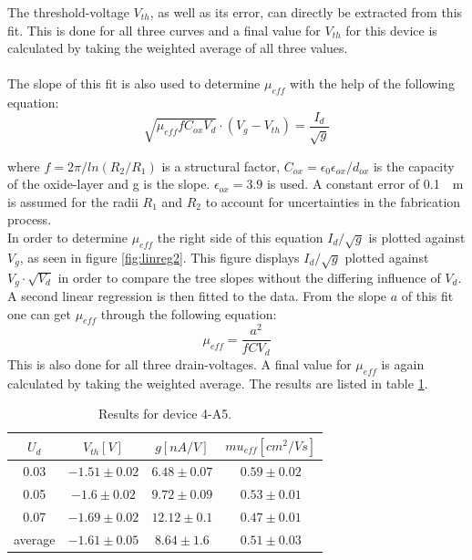 \documentclass[%
 reprint,
amsmath,amssymb,
pra,
]{revtex4-1}
\begin{document}
The threshold-voltage $V_{th}$, as well as its error, can directly be extracted from this fit. This is done for all three curves and a final value for $V_{th}$ for this device is calculated by taking the weighted average of all three values.\\
\\
The slope of this fit is also used to determine $\mu_{eff}$ with the help of the following equation:
\begin{equation}
\sqrt{\mu_{eff} f C_{ox} V_d} \cdot (V_g-V_{th}) = \dfrac{I_d}{\sqrt{g}}
\end{equation}

where $f = 2\pi / ln(R_2/R_1)$ is a structural factor, $C_{ox} = \epsilon_0 \epsilon_{ox} / d_{ox}$ is the capacity of the oxide-layer and g is the slope. $\epsilon_{ox} = 3.9$ is used. A constant error of \SI{0.1}{\mu m} is assumed for the radii $R_1$ and $R_2$ to account for uncertainties in the fabrication process.\\
In order to determine  $\mu_{eff}$ the right side of this equation $I_d/\sqrt{g}$ is plotted against $V_g$, as seen in figure \ref{fig:linreg2}. This figure displays $I_d/\sqrt{g}$ plotted against $V_g \cdot \sqrt{V_d}$ in order to compare the tree slopes without the differing influence of $V_d$. A second linear regression is then fitted to the data. From the slope $a$ of this fit one can get $\mu_{eff}$ through the following equation:
\begin{equation}
\mu_{eff} = \dfrac{a^2}{f C V_d}
\end{equation}
This is also done for all three drain-voltages. A final value for $\mu_{eff}$ is again calculated by taking the weighted average. The results are listed in table \ref{tab: exaple_data}.

\begin{table}
\centering
\begin{tabular}{|c|c|c|c|}
\hline
$U_d$ & $V_{th}[\si{V}]$ & $g[\si{nA/V}]$ & $mu_{eff}[\si{cm^2/Vs}]$\\
\hline
0.03 & $-1.51\pm 0.02$ & $6.48\pm 0.07$ & $0.59\pm 0.02$\\
\hline
0.05 & $-1.6\pm 0.02$ & $9.72\pm 0.09$ & $0.53\pm 0.01$\\
\hline
0.07 & $-1.69\pm 0.02$ & $12.12\pm 0.1$ & $0.47\pm 0.01$\\
\hline
average & $-1.61\pm 0.05$ & $8.64\pm 1.6$ &$0.51\pm 0.03$\\
\hline
\end{tabular}
\label{tab: exaple_data}
\caption{Results for device 4-A5.}
\end{table}
\end{document}
